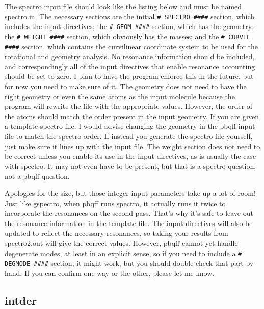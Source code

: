 \documentclass{article}
\begin{document}
The spectro input file should look like the listing below and must be
named spectro.in. The necessary sections are the initial
\verb|# SPECTRO ####| section, which includes the input directives;
the \verb|# GEOM ####| section, which has the geometry; the
\verb|# WEIGHT ####| section, which obviously has the masses; and the
\verb|# CURVIL ####| section, which contains the curvilinear
coordinate system to be used for the rotational and geometry
analysis. No resonance information should be included, and
correspondingly all of the input directives that enable resonance
accounting should be set to zero. I plan to have the program enforce
this in the future, but for now you need to make sure of it. The
geometry does not need to have the right geometry or even the same
atoms as the input molecule because the program will rewrite the file
with the appropriate values. However, the order of the atoms should
match the order present in the input geometry. If you are given a
template spectro file, I would advise changing the geometry in the
pbqff input file to match the spectro order. If instead you generate
the spectro file yourself, just make sure it lines up with the input
file. The weight section does not need to be correct unless you enable
its use in the input directives, as is usually the case with
spectro. It may not even have to be present, but that is a spectro
question, not a pbqff question.

{\tiny

}

Apologies for the size, but those integer input parameters take up a
lot of room! Just like gspectro, when pbqff runs spectro, it actually
runs it twice to incorporate the resonances on the second pass. That's
why it's safe to leave out the resonance information in the template
file. The input directives will also be updated to reflect the
necessary resonances, so taking your results from spectro2.out will
give the correct values. However, pbqff cannot yet handle degenerate
modes, at least in an explicit sense, so if you need to include a
\verb|# DEGMODE ####| section, it might work, but you should
double-check that part by hand. If you can confirm one way or the
other, please let me know.

\subsection{intder}
\end{document}
